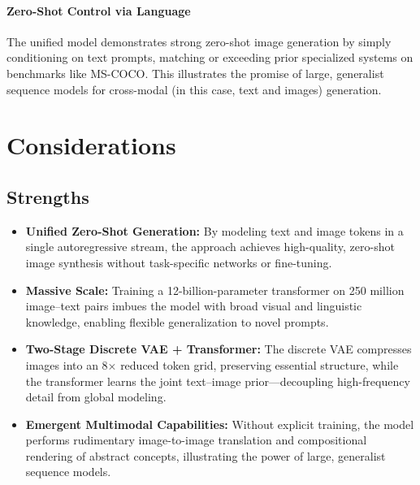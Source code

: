 \documentclass[10pt]{article}
\begin{document}
\paragraph{Zero-Shot Control via Language}
The unified model demonstrates strong zero-shot image generation by simply conditioning on text prompts, matching or exceeding prior specialized systems on benchmarks like MS-COCO. This illustrates the promise of large, generalist sequence models for cross-modal (in this case, text and images) generation.


\section*{Considerations}
\subsection*{Strengths}
\begin{itemize}
    \item \textbf{Unified Zero-Shot Generation:} By modeling text and image tokens in a single autoregressive stream, the approach achieves high-quality, zero-shot image synthesis without task-specific networks or fine-tuning.
    \item \textbf{Massive Scale:} Training a 12-billion-parameter transformer on 250 million image–text pairs imbues the model with broad visual and linguistic knowledge, enabling flexible generalization to novel prompts.
    \item \textbf{Two-Stage Discrete VAE + Transformer:} The discrete VAE compresses images into an 8× reduced token grid, preserving essential structure, while the transformer learns the joint text–image prior—decoupling high-frequency detail from global modeling.
    \item \textbf{Emergent Multimodal Capabilities:} Without explicit training, the model performs rudimentary image-to-image translation and compositional rendering of abstract concepts, illustrating the power of large, generalist sequence models.
\end{itemize}
\end{document}
